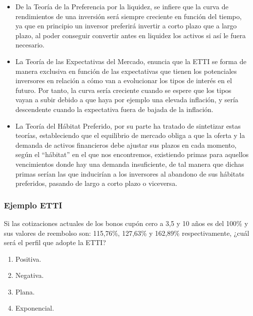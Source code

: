 \documentclass[
  letterpaper,
  DIV=11,
  numbers=noendperiod]{scrartcl}
\begin{document}
\begin{itemize}
\item
  De la Teoría de la Preferencia por la liquidez, se infiere que la
  curva de rendimientos de una inversión será siempre creciente en
  función del tiempo, ya que en principio un inversor preferirá invertir
  a corto plazo que a largo plazo, al poder conseguir convertir antes en
  liquidez los activos si así le fuera necesario.
\item
  La Teoría de las Expectativas del Mercado, enuncia que la ETTI se
  forma de manera exclusiva en función de las expectativas que tienen
  los potenciales inversores en relación a cómo van a evolucionar los
  tipos de interés en el futuro. Por tanto, la curva sería creciente
  cuando se espere que los tipos vayan a subir debido a que haya por
  ejemplo una elevada inflación, y sería descendente cuando la
  expectativa fuera de bajada de la inflación.
\item
  La Teoría del Hábitat Preferido, por su parte ha tratado de sintetizar
  estas teorías, estableciendo que el equilibrio de mercado obliga a que
  la oferta y la demanda de activos financieros debe ajustar sus plazos
  en cada momento, según el ``hábitat'' en el que nos encontremos,
  existiendo primas para aquellos vencimientos donde hay una demanda
  insuficiente, de tal manera que dichas primas serían las que
  inducirían a los inversores al abandono de sus hábitats preferidos,
  pasando de largo a corto plazo o viceversa.
\end{itemize}

\hypertarget{ejemplo-etti}{%
\subsubsection{Ejemplo ETTI}\label{ejemplo-etti}}

Si las cotizaciones actuales de los bonos cupón cero a 3,5 y 10 años es
del 100\% y sus valores de reembolso son: 115,76\%, 127,63\% y 162,89\%
respectivamente, ¿cuál será el perfil que adopte la ETTI?

\begin{enumerate}
\def\labelenumi{\alph{enumi}.}
\item
  Positiva.
\item
  Negativa.
\item
  Plana.
\item
  Exponencial.
\end{enumerate}
\end{document}
